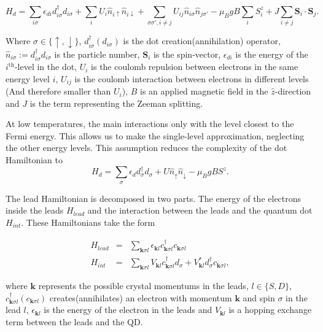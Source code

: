 \[
H_{d}=\sum_{i\sigma}\epsilon_{di}d_{i\sigma}^{\dagger}d_{i\sigma}+\sum_{i}U_{i}\hat{n}_{i\uparrow}\hat{n}_{i\downarrow}+\sum_{\sigma\sigma',i\neq j}U_{ij}\hat{n}_{i\sigma}\hat{n}_{j\sigma'}-\mu_{B}gB\sum_{i}S_{i}^{z}+J\sum_{i\neq j}\mathbf{S}_{i}\cdot\mathbf{S}_{j}.
\]


Where $\sigma\in\{\uparrow,\downarrow\}$, $d_{i\sigma}^{\dagger}\left(d_{i\sigma}\right)$
is the dot creation(annihilation) operator,$\hat{n}_{i\sigma}:=d_{i\sigma}^{\dagger}d_{i\sigma}$
is the particle number, $\mathbf{S}_{i}$ is the spin-vector, $\epsilon_{di}$
is the energy of the $i^{\mbox{th}}$-level in the dot, $U_{i}$ is
the coulomb repulsion between electrons in the same energy level $i$,
$U_{ij}$ is the coulomb interaction between electrons in different
levels (And therefore smaller than $U_{i}$), \textbf{$B$} is an
applied magnetic field in the $\hat{z}$-direction and $J$ is the
term representing the Zeeman splitting. 

At low temperatures, the main interactions only with the level closest to the Fermi energy. This allows us to make the single-level approximation, neglecting the other energy levels. This assumption reduces the complexity of the dot Hamiltonian to \\


\begin{equation}
    H_{d}=\sum_{\sigma}\epsilon_{d}d_{\sigma}^{\dagger}d_{\sigma}+U\hat{n}_{\uparrow}\hat{n}_{\downarrow}-\mu_{B}gBS^{z}. \label{eq:hdot}
\end{equation}





The lead Hamiltonian is decomposed in two parts. The energy of the electrons inside the leads $H_{lead}$ and the interaction between the leads and the quantum dot $H_{int}$. These Hamiltonians take the form 

\begin{eqnarray*}
H_{lead} & = & \sum_{\mathbf{k}\sigma l}\epsilon_{\mathbf{k}l}c_{\mathbf{k}\sigma l}^{\dagger}c_{\mathbf{k}\sigma l}\\
H_{int} & = & \sum_{\mathbf{k}\sigma l}V_{\mathbf{k}l}c_{\mathbf{k}\sigma l}^{\dagger}d_{\sigma}+V_{\mathbf{k}l}^{*}d_{\sigma}^{\dagger}c_{\mathbf{k}\sigma l},
\end{eqnarray*}


where $\mathbf{k}$ represents the possible crystal momentums in the
leads, $l\in\{S,D\}$, $c_{\mathbf{k}\sigma l}^{\dagger}(c_{\mathbf{k}\sigma l})$
creates(annihilates) an electron with momentum $\mathbf{k}$ and spin
$\sigma$ in the lead $l$, $\epsilon_{\mathbf{k}l}$ is the energy
of the electron in the leads and $V_{\mathbf{k}l}$ is a hopping exchange
term between the leads and the QD. 


